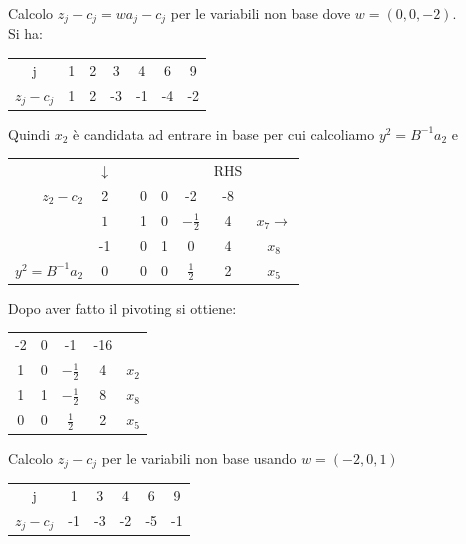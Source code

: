 Calcolo $z_{j}-c_{j}=w a_{j}-c_{j}$ per le variabili non base dove $w=(0,0,-2)$.\\
Si ha:
\begin{table}[h]
	\centering
	\begin{tabular}{c|cccccc}
		j & 1 & 2 & 3 & 4 & 6 & 9 \\ \cline{2-7}
		$z_{j}-c_{j}$ & 1 & 2 & -3 & -1 & -4 & -2
	\end{tabular}
\end{table}

Quindi $x_{2}$ è candidata ad entrare in base per cui calcoliamo $y^{2}=B^{-1}a_{2}$ e
\begin{table}[!h]
	\centering
	\def\arraystretch{1}
	\begin{tabular}{r|c|c|ccc|c|c}
		\multicolumn{1}{c}{} & \multicolumn{1}{c}{$\downarrow$} & \multicolumn{1}{c}{} &  &  & \multicolumn{1}{c}{} & \multicolumn{1}{c}{RHS} & \\ \cline{2-2} \cline{4-7}
		$z_{2}-c_{2}$ & 2 &  & 0 & 0 & -2 & -8 &  \\ \cline{2-2} \cline{4-7}
		& {\LARGE \textcircled{\normalsize $1$}} &  & 1 & 0 & $-\frac{1}{2}$ & 4 & $x_{7}\rightarrow$ \\
		& -1 &  & 0 & 1 & 0 & 4 & $x_{8}$ \\
		$y^{2}=B^{-1}a_{2}$ & 0 &  & 0 & 0 & $\frac{1}{2}$ & 2 & $x_{5}$ \\
		\cline{2-2} \cline{4-7}
	\end{tabular}
\end{table}
\clearpage
Dopo aver fatto il pivoting si ottiene:
\begin{table}[!h]
	\centering
	\begin{tabular}{|ccc|c|c}
		\cline{1-4}
		-2 & 0 & -1 & -16 &  \\ \cline{1-4}
		1 & 0 & $-\frac{1}{2}$ & 4 & $x_{2}$ \\
		1 & 1 & $-\frac{1}{2}$ & 8 & $x_{8}$ \\
		0 & 0 & $\frac{1}{2}$ & 2 & $x_{5}$ \\ \cline{1-4}
	\end{tabular}
\end{table}

Calcolo $z_{j}-c_{j}$ per le variabili non base usando $w=(-2,0,1)$
\begin{table}[h]
	\centering
	\begin{tabular}{c|ccccc}
		j & 1 & 3 & 4 & 6 & 9 \\ \cline{2-6}
		$z_{j}-c_{j}$ & -1 & -3 & -2 & -5 & -1
	\end{tabular}
\end{table}


